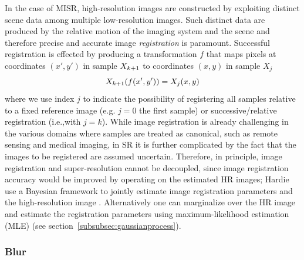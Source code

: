 In the case of MISR, high-resolution images are constructed by exploiting distinct scene data among multiple low-resolution images.
%
Such distinct data are produced by the relative motion of the imaging system and the scene and therefore precise and accurate image \textit{registration} is paramount.
%
Successful registration is effected by producing a transformation \(f\) that maps pixels at coordinates \((x',y')\) in sample \(X_{k+1}\) to coordinates \((x,y)\) in sample \(X_j\)
\begin{equation}
	\Xkone(f(x', y')) = X_j(x,y)
	\label{eqn:registration}
\end{equation}
where we use index \(j\) to indicate the possibility of registering all samples relative to a fixed reference image (e.g. \(j=0\) the first sample) or successive/relative registration (i.e.,with \(j=k\)).
%
While image registration is already challenging in the various domains where samples are treated as canonical, such as remote sensing and medical imaging, in SR it is further complicated by the fact that the images to be registered are assumed uncertain.
%
Therefore, in principle, image registration and super-resolution cannot be decoupled, since image registration accuracy would be improved by operating on the estimated HR images;
%
Hardie \etal \cite{Hardie1997} use a Bayesian framework to jointly estimate image registration parameters and the high-resolution image \cite{Hardie1997}.
%
Alternatively one can marginalize over the HR image and estimate the registration parameters using maximum-likelihood estimation (MLE) (see section~\ref{subsubsec:gaussianprocess}).

\subsubsection{Blur}

